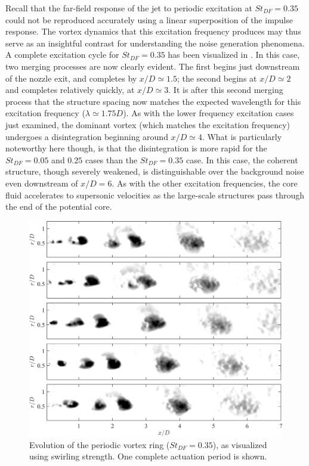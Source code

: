 Recall that the far-field response of the jet to periodic excitation at $St_{DF}=0.35$ could not be reproduced accurately using a linear superposition of the impulse response.
The vortex dynamics that this excitation frequency produces may thus serve as an insightful contrast for understanding the noise generation phenomena.
A complete excitation cycle for $St_{DF}=0.35$ has been visualized in .
In this case, two merging processes are now clearly evident.
The first begins just downstream of the nozzle exit, and completes by $x/D \simeq 1.5$; the second begins at $x/D \simeq 2$ and completes relatively quickly, at $x/D \simeq 3$.
It is after this second merging process that the structure spacing now matches the expected wavelength for this excitation frequency ($\lambda \simeq 1.75D$).
As with the lower frequency excitation cases just examined, the dominant vortex (which matches the excitation frequency) undergoes a disintegration beginning around $x/D \simeq 4$.
What is particularly noteworthy here though, is that the disintegration is more rapid for the $St_{DF}=0.05$ and $0.25$ cases than the $St_{DF}=0.35$ case.
In this case, the coherent structure, though severely weakened, is distinguishable over the background noise even downstream of $x/D = 6$.
As with the other excitation frequencies, the core fluid accelerates to supersonic velocities as the large-scale structures pass through the end of the potential core.
\begin{figure}
	\centering
	\includegraphics[width=5in]{Figures/ch4_St035_lambda_evolution.png}
	\caption{Evolution of the periodic vortex ring ($St_{DF}=0.35$), as visualized using swirling strength. One complete actuation period is shown.}
	\label{fig:ch4_St035_structure_disintegration}
\end{figure}

